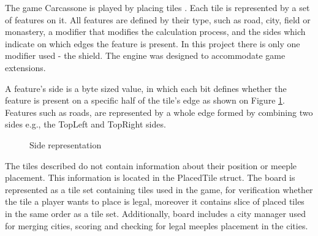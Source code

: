 The game Carcassone is played by placing tiles \cite{CarcassoneRules}. Each tile is represented by a set of features on it. All features are defined by their type, such as road, city, field or monastery, a modifier that modifies the calculation process, and the sides which indicate on which edges the feature is present. In this project there is only one modifier used - the shield. The engine was designed to accommodate game extensions. 

A feature's side is a byte sized value, in which each bit defines whether the feature is present on a specific half of the tile's edge as shown on Figure \ref{fig:SIDES}. Features such as roads, are represented by a whole edge formed by combining two sides e.g., the TopLeft and TopRight sides.
\begin{figure}
    \centering
    \caption{Side representation} \label{fig:SIDES}
\end{figure}

The tiles described do not contain information about their position or meeple placement. This information is located in the PlacedTile struct. The board is represented as a tile set containing tiles used in the game, for verification whether the tile a player wants to place is legal,  moreover it contains slice of placed tiles in the same order as a tile set. Additionally, board includes a city manager used for merging cities, scoring and checking for legal meeples placement in the cities.

